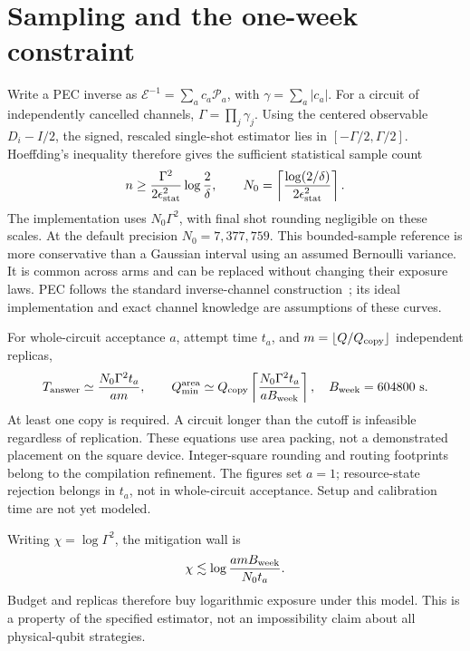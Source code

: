 \documentclass[11pt]{article}
\newcommand{\eps}{\epsilon}
\begin{document}
\section{Sampling and the one-week constraint}
Write a PEC inverse as $\mathcal{E}^{-1}=\sum_a c_a\mathcal{P}_a$, with
$\gamma=\sum_a|c_a|$. For a circuit of independently cancelled channels,
$\Gamma=\prod_j\gamma_j$. Using the centered observable $D_i-I/2$, the
signed, rescaled single-shot estimator lies in $[-\Gamma/2,\Gamma/2]$.
Hoeffding's inequality therefore gives the sufficient statistical sample count
\begin{equation}\label{eq:shots}
 n\geq \frac{\Gamma^2}{2\eps_{\rm stat}^2}\log\frac{2}{\delta},
 \qquad N_0=\left\lceil\frac{\log(2/\delta)}{2\eps_{\rm stat}^2}\right\rceil.
\end{equation}
The implementation uses $N_0\Gamma^2$, with final shot rounding negligible
on these scales. At the default precision $N_0=7{,}377{,}759$.
This bounded-sample reference is more conservative than a Gaussian interval
using an assumed Bernoulli variance. It is common across arms and can be replaced
without changing their exposure laws. PEC follows the standard inverse-channel
construction~\cite{temme}; its ideal implementation and exact channel knowledge
are assumptions of these curves.

For whole-circuit acceptance $a$, attempt time $t_a$, and
$m=\lfloor Q/Q_{\rm copy}\rfloor$ independent replicas,
\begin{equation}\label{eq:time}
 T_{\rm answer}\simeq\frac{N_0\Gamma^2 t_a}{am},\qquad
 Q_{\min}^{\rm area}\simeq Q_{\rm copy}
 \left\lceil\frac{N_0\Gamma^2t_a}{aB_{\rm week}}\right\rceil,
 \quad B_{\rm week}=604800~\mathrm{s}.
\end{equation}
At least one copy is required. A circuit longer than the cutoff is infeasible
regardless of replication. These equations use area packing, not a demonstrated
placement on the square device. Integer-square rounding and routing footprints
belong to the compilation refinement. The figures set $a=1$; resource-state
rejection belongs in $t_a$, not in whole-circuit acceptance. Setup and calibration
time are not yet modeled.

Writing $\chi=\log\Gamma^2$, the mitigation wall is
\begin{equation}
 \chi\lesssim\log\frac{a m B_{\rm week}}{N_0t_a}.
\end{equation}
Budget and replicas therefore buy logarithmic exposure under this model.
This is a property of the specified estimator, not an impossibility claim
about all physical-qubit strategies.
\end{document}
